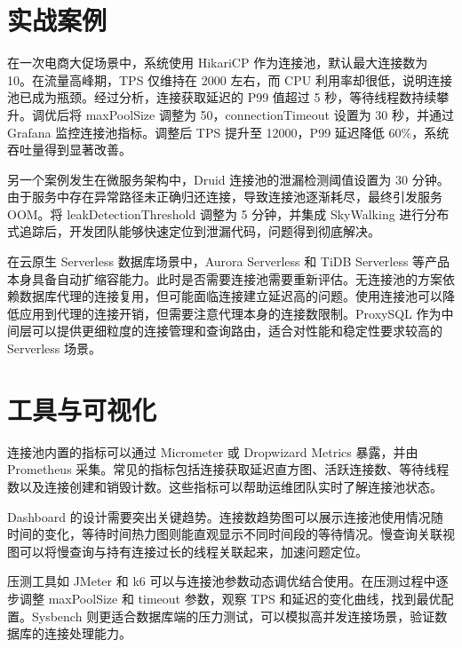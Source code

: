 \chapter{实战案例}
在一次电商大促场景中，系统使用 HikariCP 作为连接池，默认最大连接数为 10。在流量高峰期，TPS 仅维持在 2000 左右，而 CPU 利用率却很低，说明连接池已成为瓶颈。经过分析，连接获取延迟的 P99 值超过 5 秒，等待线程数持续攀升。调优后将 maxPoolSize 调整为 50，connectionTimeout 设置为 30 秒，并通过 Grafana 监控连接池指标。调整后 TPS 提升至 12000，P99 延迟降低 60\%{}，系统吞吐量得到显著改善。\par
另一个案例发生在微服务架构中，Druid 连接池的泄漏检测阈值设置为 30 分钟。由于服务中存在异常路径未正确归还连接，导致连接池逐渐耗尽，最终引发服务 OOM。将 leakDetectionThreshold 调整为 5 分钟，并集成 SkyWalking 进行分布式追踪后，开发团队能够快速定位到泄漏代码，问题得到彻底解决。\par
在云原生 Serverless 数据库场景中，Aurora Serverless 和 TiDB Serverless 等产品本身具备自动扩缩容能力。此时是否需要连接池需要重新评估。无连接池的方案依赖数据库代理的连接复用，但可能面临连接建立延迟高的问题。使用连接池可以降低应用到代理的连接开销，但需要注意代理本身的连接数限制。ProxySQL 作为中间层可以提供更细粒度的连接管理和查询路由，适合对性能和稳定性要求较高的 Serverless 场景。\par
\chapter{工具与可视化}
连接池内置的指标可以通过 Micrometer 或 Dropwizard Metrics 暴露，并由 Prometheus 采集。常见的指标包括连接获取延迟直方图、活跃连接数、等待线程数以及连接创建和销毁计数。这些指标可以帮助运维团队实时了解连接池状态。\par
Dashboard 的设计需要突出关键趋势。连接数趋势图可以展示连接池使用情况随时间的变化，等待时间热力图则能直观显示不同时间段的等待情况。慢查询关联视图可以将慢查询与持有连接过长的线程关联起来，加速问题定位。\par
压测工具如 JMeter 和 k6 可以与连接池参数动态调优结合使用。在压测过程中逐步调整 maxPoolSize 和 timeout 参数，观察 TPS 和延迟的变化曲线，找到最优配置。Sysbench 则更适合数据库端的压力测试，可以模拟高并发连接场景，验证数据库的连接处理能力。\par
